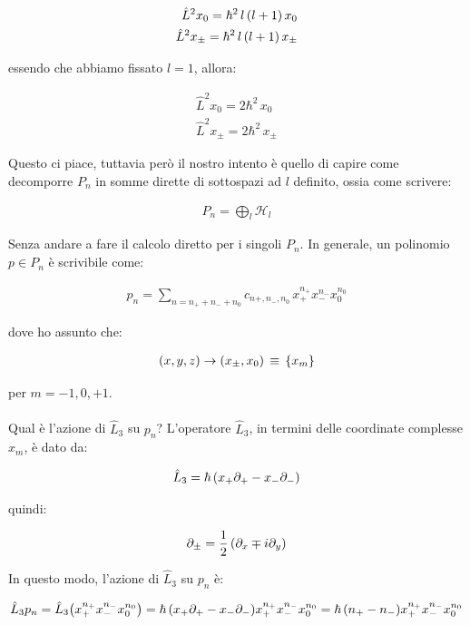 \begin{align*}
	\hat{L}^2 x_0 = \hbar^2 \, l \, \qty(l +1) \, x_0 \\
	\hat{L}^2 x_{\pm} = \hbar^2 \, l \, \qty(l +1) \, x_{\pm}
\end{align*}	

	essendo che abbiamo fissato $ l =1 $, allora:

\begin{align*}
	\hat{L}^2 x_0 = 2 \hbar^2 \, x_0 \\
	\hat{L}^2 x_{\pm} = 2 \hbar^2 \, x_{\pm}
\end{align*}

	Questo ci piace, tuttavia però il nostro intento è quello di capire come decomporre $P_n$ in somme dirette di sottospazi ad $l$ definito, ossia come scrivere:
	
\begin{align*}
	P_n = \bigoplus_l \mathcal{H}_l
\end{align*}

	Senza andare a fare il calcolo diretto per i singoli $P_n$. In generale, un polinomio $p \in P_n$ è scrivibile come:

\begin{align*}
	p_n = \sum_{n = n_+ + n_- + n_0} c_{n+, n_-, n_0} \, x_+^{n_+} x_-^{n_-} x_0^{n_0}
\end{align*}

	dove ho assunto che:
	
\begin{align*}
	\qty(x, y, z) \to \qty(x_{\pm}, x_0) \, \equiv \, \qty{x_m} 
\end{align*}

	per $m = -1, 0, +1$.
	\\
	\\
	Qual è l'azione di $\hat{L}_3$ su $p_n$? L'operatore $\hat{L}_3$, in termini delle coordinate complesse $x_m$, è dato da:
	
\begin{align*}
	\hat{L}_3 = \hbar \, \qty( x_+ \partial_+ - x_- \partial_-)
\end{align*}

	quindi:
	
\begin{align*}
	\partial_{\pm} = \frac{1}{2} \, \qty(\partial_x \mp i \partial_y)
\end{align*}

	In questo modo, l'azione di $\hat{L}_3$ su $p_n$ è:
	
\begin{align*}
	\hat{L}_3 p_n = \hat{L}_3 \qty( x_+^{n_+} x_-^{n_-} x_0^{n_0}) = \hbar \, \qty( x_+ \partial_+ - x_- \partial_-) x_+^{n_+} x_-^{n_-} x_0^{n_0} = \hbar \, \qty(n_+ - n_-) x_+^{n_+} x_-^{n_-} x_0^{n_0}
\end{align*}

